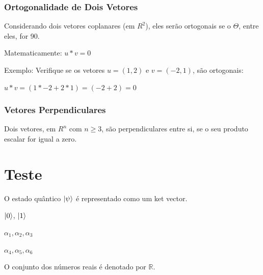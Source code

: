 \documentclass[12pt]{article}
\begin{document}
\subsubsection{Ortogonalidade de Dois Vetores}

Considerando dois vetores coplanares (em \(R^{2}\)), eles serão ortogonais se o $\Theta$, entre eles, for 90\degree.

Matematicamente: \(u * v = 0\)

Exemplo: Verifique se os vetores \(u = (1, 2)\) e \(v = (-2, 1)\), são ortogonais:

\(u * v = (1 * -2 + 2 * 1) = (-2 + 2) = 0\)


\subsubsection{Vetores Perpendiculares}

Dois vetores, em \(R^{n}\) com \(n \geq 3\), são perpendiculares entre si, se o seu produto escalar for igual a zero.

\section{Teste}

O estado quântico $\ket{\psi}$ é representado como um ket vector.

$\ket{0}$, $\ket{1}$

$\alpha_{1}, \alpha_{2}, \alpha_{3}$

\(\alpha_{4}, \alpha_{5}, \alpha_{6} \)

O conjunto dos números reais é denotado por $\mathbb{R}$.



\newpage

	
\end{document}
